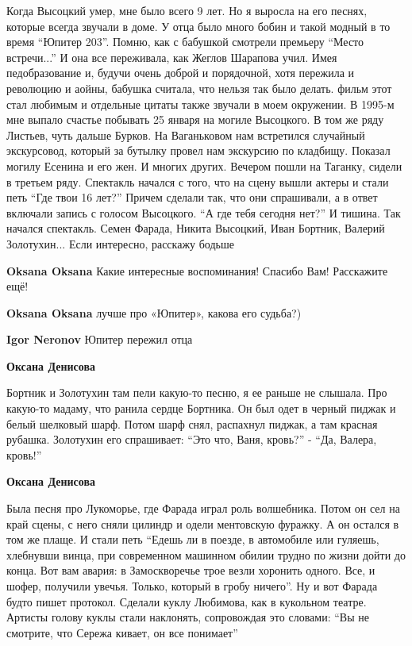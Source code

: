 \begin{itemize}
Когда Высоцкий умер, мне было всего 9 лет. Но я выросла на его песнях, которые
всегда звучали в доме. У отца было много бобин и такой модный в то время
\enquote{Юпитер 203}. Помню, как с бабушкой смотрели премьеру \enquote{Место
встречи...} И она все переживала, как Жеглов Шарапова учил. Имея педобразование
и, будучи очень доброй и порядочной, хотя пережила и революцию и аойны, бабушка
считала, что нельзя так было делать. фильм этот стал любимым и отдельные цитаты
также звучали в моем окружении. В 1995-м мне выпало счастье побывать 25 января
на могиле Высоцкого. В том же ряду Листьев, чуть дальше Бурков. На Ваганьковом
нам встретился случайный экскурсовод, который за бутылку провел нам экскурсию
по кладбищу. Показал могилу Есенина и его жен. И многих других. Вечером пошли
на Таганку, сидели в третьем ряду. Спектакль начался с того, что на сцену вышли
актеры и стали петь \enquote{Где твои 16 лет?} Причем сделали так, что они
спрашивали, а в ответ включали запись с голосом Высоцкого. \enquote{А где тебя
сегодня нет?} И тишина. Так начался спектакль. Семен Фарада, Никита Высоцкий,
Иван Бортник, Валерий Золотухин... Если интересно, расскажу бодьше

\begin{itemize} %
\textbf{Oksana Oksana} Какие интересные воспоминания! Спасибо Вам! Расскажите ещё!

\textbf{Oksana Oksana} лучше про «Юпитер», какова его судьба?)

\textbf{Igor Neronov} Юпитер пережил отца

\textbf{Оксана Денисова} 

Бортник и Золотухин там пели какую-то песню, я ее раньше не слышала. Про
какую-то мадаму, что ранила сердце Бортника. Он был одет в черный пиджак и
белый шелковый шарф. Потом шарф снял, распахнул пиджак, а там красная
рубашка. Золотухин его спрашивает: \enquote{Это что, Ваня, кровь?} - \enquote{Да, Валера, кровь!}


\textbf{Оксана Денисова}

Была песня про Лукоморье, где Фарада играл роль волшебника. Потом он сел на край
сцены, с него сняли цилиндр и одели ментовскую фуражку. А он остался в том же
плаще. И стали петь \enquote{Едешь ли в поезде, в автомобиле или гуляешь, хлебнувши
винца, при современном машинном обилии трудно по жизни дойти до конца. Вот вам
авария: в Замоскворечье трое везли хоронить одного. Все, и шофер, получили
увечья. Только, который в гробу ничего}. Ну и вот Фарада будто пишет
протокол. Сделали куклу Любимова, как в кукольном театре. Артисты голову куклы
стали наклонять, сопровождая это словами: \enquote{Вы не смотрите, что Сережа кивает,
он все понимает}


\end{itemize}
\end{itemize}
